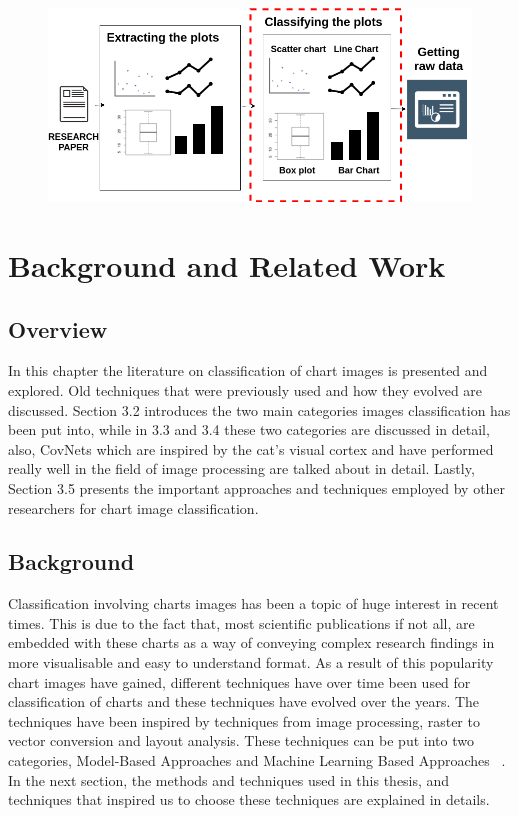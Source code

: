 \documentclass[12pt, a4paper,oneside]{report}
\begin{document}
\begin{figure}[!htb]
\includegraphics [scale=0.48] {vision}
\label{fig:vis}
\end{figure}


\chapter{Background and Related Work}

\section{Overview}
In this chapter the literature on classification of chart images is presented and explored. Old techniques that were previously used and how they evolved are discussed. Section 3.2 introduces the two main categories images classification has been put into, while in 3.3 and 3.4 these two categories are discussed in detail, also, CovNets which are inspired by the cat’s visual cortex and have performed really well in the field of image processing are talked about in detail. Lastly, Section 3.5 presents the important approaches and techniques employed by other researchers for chart image classification.

\section{Background}
Classification involving charts images has been a topic of huge interest in recent times. This is due to the fact that, most scientific publications if not all, are embedded with these charts as a way of conveying complex research findings in more visualisable and easy to understand format. As a result of this popularity chart images have gained, different techniques have over time been used for classification of charts and these techniques have evolved over the years. The techniques have been inspired by techniques from image processing, raster to vector conversion and layout analysis. These techniques can be put into two categories, Model-Based Approaches and Machine Learning Based Approaches ~\cite{amara2017convolutional}. In the next section, the methods and techniques used in this thesis, and techniques that inspired us to choose these techniques are explained in details.
\end{document}
